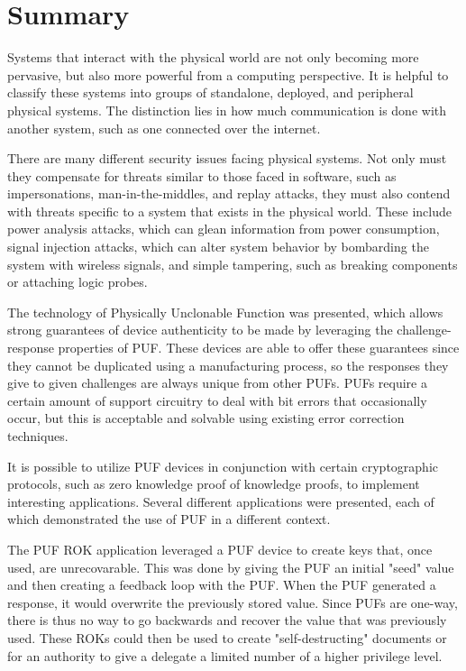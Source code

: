 %
%

\chapter{Summary}
\label{chapter:conclusion}

Systems that interact with the physical world are not only becoming more pervasive, but also more powerful
from a computing perspective. It is helpful to classify these systems into groups of standalone, deployed, and
peripheral physical systems. The distinction lies in how much communication is done with another system,
such as one connected over the internet.

There are many different security issues facing physical systems. Not only must they compensate for threats similar
to those faced in software, such as impersonations, man-in-the-middles, and replay attacks, they must also
contend with threats specific to a system that exists in the physical world. These include power analysis attacks,
which can glean information from power consumption, signal injection attacks, which can alter system behavior by
bombarding the system with wireless signals, and simple tampering, such as breaking components or attaching logic
probes.

The technology of Physically Unclonable Function was presented, which allows strong guarantees of device authenticity
to be made by leveraging the challenge-response properties of PUF. These devices are able to offer these guarantees
since they cannot be duplicated using a manufacturing process, so the responses they give to given challenges are
always unique from other PUFs. PUFs require a certain amount of support circuitry to deal with bit errors that occasionally
occur, but this is acceptable and solvable using existing error correction techniques.

It is possible to utilize PUF devices in conjunction with certain cryptographic protocols, such as zero knowledge proof
of knowledge proofs, to implement interesting applications. Several different applications were presented, each of
which demonstrated the use of PUF in a different context.

The PUF ROK application leveraged a PUF device to create keys that, once used, are unrecovarable. This was done by
giving the PUF an initial "seed" value and then creating a feedback loop with the PUF. When the PUF generated a response,
it would overwrite the previously stored value. Since PUFs are one-way, there is thus no way to go backwards and
recover the value that was previously used. These ROKs could then be used to create "self-destructing" documents
or for an authority to give a delegate a limited number of a higher privilege level.

